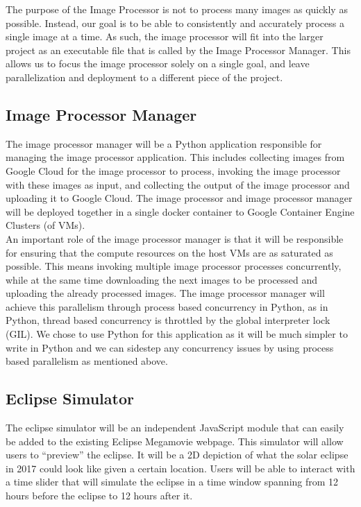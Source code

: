 \documentclass[10pt, onecolumn, draftclsnofoot, letterpaper, compsoc]{IEEEtran}
\begin{document}
The purpose of the Image Processor is not to process many images as quickly as
possible. Instead, our goal is to be able to consistently and accurately process
a single image at a time. As such, the image processor will fit into the larger
project as an executable file that is called by the Image Processor Manager.
This allows us to focus the image processor solely on a single goal, and leave
parallelization and deployment to a different piece of the project.

\subsection{Image Processor Manager}

The image processor manager will be a Python application responsible for managing the image processor
application. This includes collecting images from Google Cloud for the image processor to process,
invoking the image processor with these images as input, and collecting the output of the image
processor and uploading it to Google Cloud. The image processor and image processor manager will be
deployed together in a single docker container to Google Container Engine Clusters (of VMs). \\

An important role of the image processor manager is that it will be responsible for ensuring that
the compute resources on the host VMs are as saturated as possible. This means invoking multiple
image processor processes concurrently, while at the same time downloading the next images to be
processed and uploading the already processed images. The image processor manager will achieve
this parallelism through process based concurrency in Python, as in Python, thread based concurrency
is throttled by the global interpreter lock (GIL). We chose to use Python for this application as it
will be much simpler to write in Python and we can sidestep any concurrency issues by using process
based parallelism as mentioned above. \\

\subsection{Eclipse Simulator}

The eclipse simulator will be an independent JavaScript module that can easily
be added to the existing Eclipse Megamovie webpage. This simulator will allow
users to “preview” the eclipse. It will be a 2D depiction of what the solar
eclipse in 2017 could look like given a certain location. Users will be able
to interact with a time slider that will simulate the eclipse in a time
window spanning from 12 hours before the eclipse to 12 hours after it.
\end{document}
